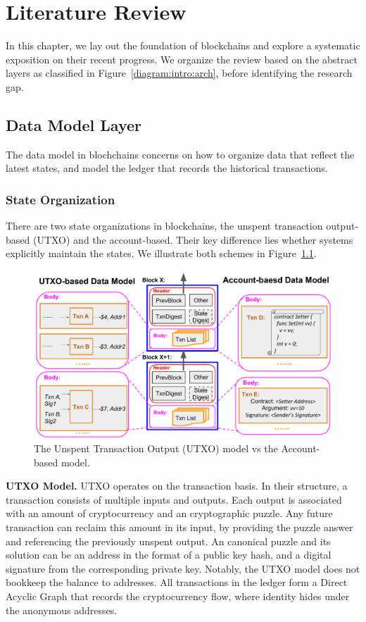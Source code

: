 
\chapter{Literature Review}
\label{ch:literature}
In this chapter, we lay out the foundation of blockchains and explore a systematic exposition on their recent progress.
We organize the review based on the abstract layers as classified in Figure~\ref{diagram:intro:arch}, before identifying the research gap. 

\section{Data Model Layer}
\label{ch:literature:datamodel}
The data model in blochchains concerns on how to organize data that reflect the latest states, and model the ledger that records the historical transactions. 

\subsection{State Organization}
There are two state organizations in blockchains, the unspent transaction output-based (UTXO) and the account-based. Their key difference lies whether systems explicitly maintain the states. We illustrate both schemes in Figure~\ref{diagram:literature:data_model}.

\begin{figure}
    \centering
    \includegraphics[width=0.8\linewidth]{diagram/literature/data_model.pdf}
    \vspace{\BeforeCaptionVSpace}
    \caption{The Unspent Transaction Output (UTXO) model vs the Account-based model. }
    \label{diagram:literature:data_model}
\end{figure}

\textbf{UTXO Model.}
UTXO operates on the transaction basis. In their structure, a transaction consists of multiple inputs and outputs. Each output is associated with an amount of cryptocurrency and an cryptographic puzzle. Any future transaction can reclaim this amount in its input, by providing the puzzle answer and referencing the previously unspent output. An canonical puzzle and its solution can be an address in the format of a public key hash, and a digital signature from the corresponding private key. Notably, the UTXO model does not bookkeep the balance to addresses. All transactions in the ledger form a Direct Acyclic Graph that records the cryptocurrency flow, where identity hides under the anonymous addresses. 

